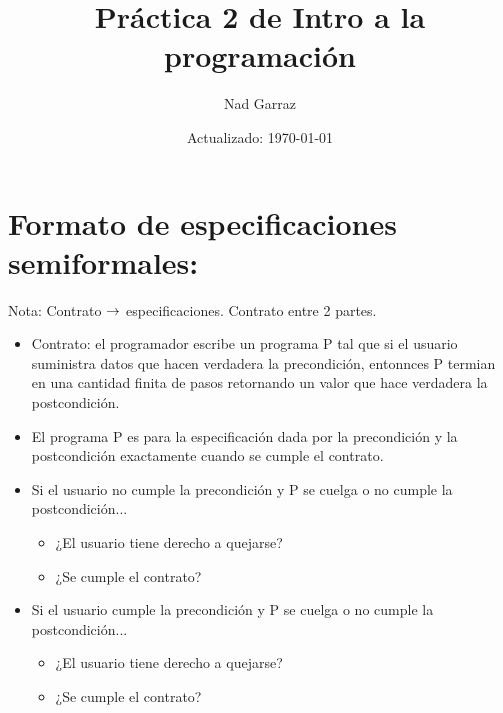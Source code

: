 \documentclass[12pt,a4paper,spanish]{article}
\begin{document}
\pagestyle{empty} %

\title{Práctica 2 de Intro a la programación}
\author{Nad Garraz}
\date{Actualizado: \today} %
\maketitle
\thispagestyle{empty}


\section{Formato de especificaciones semiformales:}

Nota: Contrato $\rightarrow$ especificaciones. Contrato entre 2 partes.
\begin{itemize}
	\item Contrato: el programador escribe un programa P tal que si el usuario suministra datos que hacen verdadera
	      la precondición, entonnces P termian en una cantidad finita de pasos retornando un valor que hace verdadera la postcondición.
	\item El programa P es  para la especificación dada por la precondición y la postcondición exactamente cuando se cumple el contrato.
	\item Si el usuario no cumple la precondición y P se cuelga o no cumple la postcondición...
	      \begin{itemize}
		      \item ¿El usuario tiene derecho a quejarse? 
		      \item ¿Se cumple el contrato? 
	      \end{itemize}
	\item Si el usuario cumple la precondición y P se cuelga o no cumple la postcondición...
	      \begin{itemize}
		      \item ¿El usuario tiene derecho a quejarse? 
		      \item ¿Se cumple el contrato? 
	      \end{itemize}
\end{itemize}

\separador
\ejercicio
\end{document}
